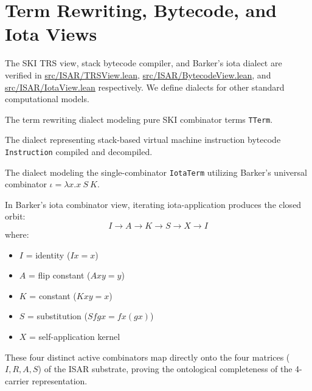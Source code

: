 \section{Term Rewriting, Bytecode, and Iota Views}

The SKI TRS view, stack bytecode compiler, and Barker's iota dialect are verified in \url{src/ISAR/TRSView.lean}, \url{src/ISAR/BytecodeView.lean}, and \url{src/ISAR/IotaView.lean} respectively. We define dialects for other standard computational models.

\begin{definition}
The term rewriting dialect modeling pure SKI combinator terms \texttt{TTerm}.
\end{definition}

\begin{definition}
The dialect representing stack-based virtual machine instruction bytecode \texttt{Instruction} compiled and decompiled.
\end{definition}

\begin{definition}
The dialect modeling the single-combinator \texttt{IotaTerm} utilizing Barker's universal combinator $\iota = \lambda x. x\ S\ K$.
\end{definition}

In Barker's iota combinator view, iterating iota-application produces the closed orbit:
$$ I \to A \to K \to S \to X \to I $$
where:
\begin{itemize}
    \item $I$ = identity ($I x = x$)
    \item $A$ = flip constant ($A x y = y$)
    \item $K$ = constant ($K x y = x$)
    \item $S$ = substitution ($S f g x = f x (g x)$)
    \item $X$ = self-application kernel
\end{itemize}
These four distinct active combinators map directly onto the four matrices ($I, R, A, S$) of the ISAR substrate, proving the ontological completeness of the 4-carrier representation.
